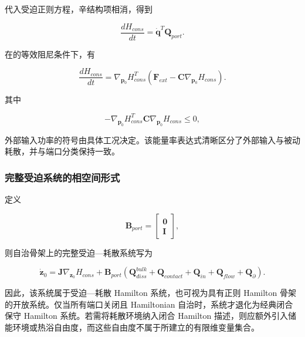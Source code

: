 代入受迫正则方程，辛结构项相消，得到

\begin{equation}
\label{eq:hamiltonian-3-37}
\boxed{\frac{dH_{cons}}{dt} = {\dot{\mathbf{q}}}^{T}\mathbf{Q}_{port}.}
\end{equation}

在的等效阻尼条件下，有

\begin{equation}
\label{eq:hamiltonian-3-38}
\boxed{\frac{dH_{cons}}{dt} = \nabla_{\mathbf{p}_{0}}H_{cons}^{T}\left( \mathbf{F}_{ext} - \mathbf{C}\nabla_{\mathbf{p}_{0}}H_{cons} \right).}
\end{equation}

其中

\begin{equation}
\label{eq:hamiltonian-3-39}
- \nabla_{\mathbf{p}_{0}}H_{cons}^{T}\mathbf{C}\nabla_{\mathbf{p}_{0}}H_{cons} \leq 0,
\end{equation}

外部输入功率的符号由具体工况决定。该能量率表达式清晰区分了外部输入与被动耗散，并与端口分类保持一致。

\subsubsection{完整受迫系统的相空间形式}\label{sec:hamiltonian-3-4-4}

定义

\begin{equation}
\label{eq:hamiltonian-3-40}
\mathbf{B}_{port} = \begin{bmatrix}
\mathbf{0} \\
\mathbf{I}
\end{bmatrix},
\end{equation}

则自治骨架上的完整受迫---耗散系统写为

\begin{equation}
\label{eq:hamiltonian-3-41}
\boxed{{\dot{\mathbf{z}}}_{0} = \mathbf{J}\nabla_{\mathbf{z}_{0}}H_{cons} + \mathbf{B}_{port}\left( \mathbf{Q}_{diss}^{bulk} + \mathbf{Q}_{contact} + \mathbf{Q}_{in} + \mathbf{Q}_{flow} + \mathbf{Q}_{\partial} \right).}
\end{equation}

因此，该系统属于受迫---耗散 Hamilton 系统，也可视为具有正则 Hamilton 骨架的开放系统。仅当所有端口关闭且 Hamiltonian 自治时，系统才退化为经典闭合保守 Hamilton 系统。若需将耗散环境纳入闭合 Hamilton 描述，则应额外引入储能环境或热浴自由度，而这些自由度不属于所建立的有限维变量集合。

